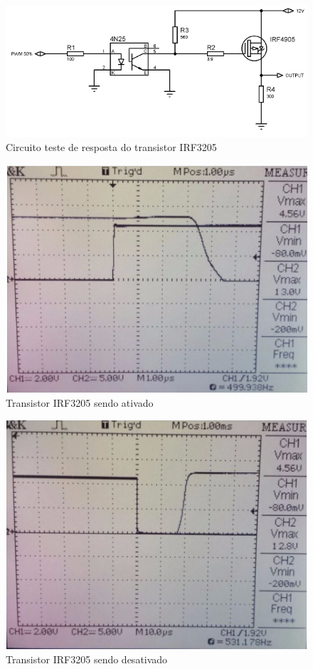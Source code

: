 	\begin{figure}[!htp]
		\centering
		\includegraphics[scale=0.60]{circuito_teste_resposta.png}
		\caption{Circuito teste de resposta do transistor IRF3205}
		\label{img:Circuito_teste_de_resposta_do_transistor_IRF3205}
	\end{figure}
	
	\begin{figure}[!htp]
		\centering
		\includegraphics[scale=0.60]{transistor_sendo_ativado.png}
		\caption{Transistor IRF3205 sendo ativado}
		\label{img:Transistor IRF3205 sendo ativado}
	\end{figure}
	
	\begin{figure}[!htp]
		\centering
		\includegraphics[scale=0.60]{transistor_sendo_ativado_2.png}
		\caption{Transistor IRF3205 sendo desativado}
		\label{img:Transistor IRF3205 sendo desativado}
	\end{figure}
	
